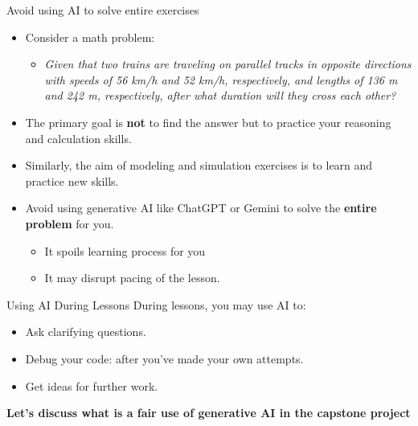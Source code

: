 \begin{frame}{Avoid using AI to solve entire exercises}
    \begin{itemize}
        \item Consider a math problem: 
        \begin{itemize}
            \item \textit{Given that two trains are traveling on parallel tracks in opposite directions with speeds of 56 km/h and 52 km/h, respectively, and lengths of 136 m and 242 m, respectively, after what duration will they cross each other?}
        \end{itemize}
        \item The primary goal is \textbf{not} to find the answer but to practice your reasoning and calculation skills.
        \item Similarly,  the aim of modeling and simulation exercises is to learn and practice new skills.
        \item Avoid using generative AI like ChatGPT or Gemini to solve the \textbf{entire problem} for you.      
        \begin{itemize}
            \item It spoils learning process for you
            \item It may disrupt pacing of the lesson. 
        \end{itemize}
    \end{itemize}
\end{frame}

\begin{frame}{Using AI During Lessons} %
\Large 
During lessons, you may use AI to:

\begin{itemize}
    \item Ask clarifying questions. 
    \item Debug your code: after you've made your own attempts. 
    \item Get ideas for further work. 
\end{itemize}

\vspace{0.5cm}  %

\begin{center}
\textbf{Let's discuss what is a fair use of generative AI in the capstone project} 
\end{center}
\end{frame}

